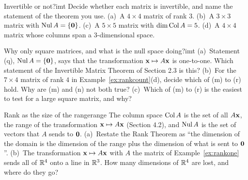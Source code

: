 \documentclass[11pt]{article}
\begin{document}
\begin{kc}{Invertible or not?}{imt}
Decide whether each matrix is invertible, and name the statement of the theorem you use. (a)~A $4\times4$ matrix of rank $3$. (b)~A $3\times3$ matrix with $\operatorname{Nul} A=\{\mathbf{0}\}$. (c)~A $5\times5$ matrix with $\dim\operatorname{Col} A=5$. (d)~A $4\times4$ matrix whose columns span a $3$-dimensional space.
\end{kc}

\begin{think}{Why only square matrices, and what is the null space doing?}{imt}
(a)~Statement (q), $\operatorname{Nul} A=\{\mathbf{0}\}$, says that the transformation $\mathbf{x}\mapsto A\mathbf{x}$ is one-to-one. Which statement of the Invertible Matrix Theorem of Section 2.3 is this? (b)~For the $7\times4$ matrix of rank $4$ in Example~\ref{ex:rankcount}(d), decide which of (m) to (r) hold. Why are (m) and (n) not both true? (c)~Which of (m) to (r) is the easiest to test for a large square matrix, and why?
\end{think}

\begin{think}{Rank as the size of the range}{range}
The column space $\operatorname{Col} A$ is the set of all $A\mathbf{x}$, the range of the transformation $\mathbf{x}\mapsto A\mathbf{x}$ (Section 4.2), and $\operatorname{Nul} A$ is the set of vectors that $A$ sends to $\mathbf{0}$. (a)~Restate the Rank Theorem as ``the dimension of the domain is the dimension of the range plus the dimension of what is sent to $\mathbf{0}$''. (b)~The transformation $\mathbf{x}\mapsto A\mathbf{x}$ with $A$ the matrix of Example~\ref{ex:rankone} sends all of $\mathbb{R}^4$ onto a line in $\mathbb{R}^3$. How many dimensions of $\mathbb{R}^4$ are lost, and where do they go?
\end{think}
\end{document}
